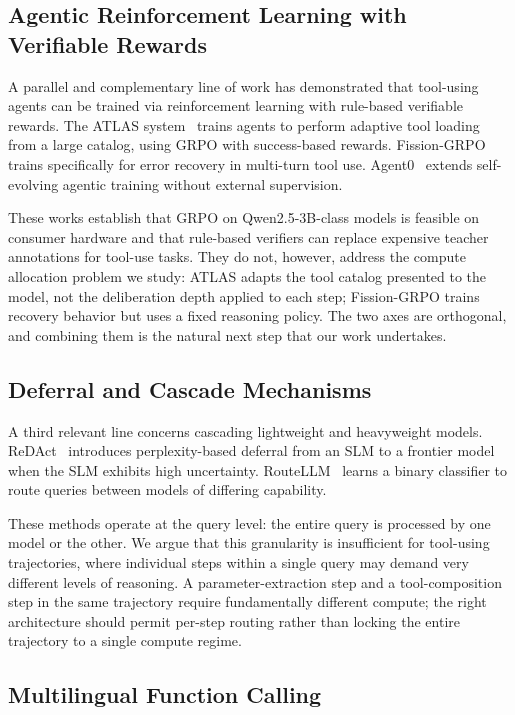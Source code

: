 \documentclass[11pt,a4paper]{article}
\begin{document}
\subsection{Agentic Reinforcement Learning with Verifiable Rewards}

A parallel and complementary line of work has demonstrated that tool-using agents can be trained via reinforcement learning with rule-based verifiable rewards. The ATLAS system~\cite{atlas} trains agents to perform adaptive tool loading from a large catalog, using GRPO with success-based rewards. Fission-GRPO~\cite{fission_grpo} trains specifically for error recovery in multi-turn tool use. Agent0~\cite{agent0} extends self-evolving agentic training without external supervision.

These works establish that GRPO on Qwen2.5-3B-class models is feasible on consumer hardware and that rule-based verifiers can replace expensive teacher annotations for tool-use tasks. They do not, however, address the compute allocation problem we study: ATLAS adapts the tool catalog presented to the model, not the deliberation depth applied to each step; Fission-GRPO trains recovery behavior but uses a fixed reasoning policy. The two axes are orthogonal, and combining them is the natural next step that our work undertakes.

\subsection{Deferral and Cascade Mechanisms}

A third relevant line concerns cascading lightweight and heavyweight models. ReDAct~\cite{redact} introduces perplexity-based deferral from an SLM to a frontier model when the SLM exhibits high uncertainty. RouteLLM~\cite{routellm} learns a binary classifier to route queries between models of differing capability.

These methods operate at the query level: the entire query is processed by one model or the other. We argue that this granularity is insufficient for tool-using trajectories, where individual steps within a single query may demand very different levels of reasoning. A parameter-extraction step and a tool-composition step in the same trajectory require fundamentally different compute; the right architecture should permit per-step routing rather than locking the entire trajectory to a single compute regime.

\subsection{Multilingual Function Calling}
\end{document}
